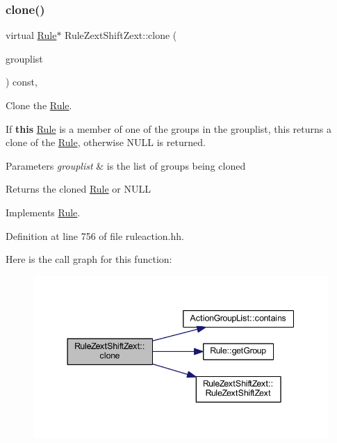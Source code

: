 \subsubsection{\texorpdfstring{clone()}{clone()}}
{\footnotesize\ttfamily virtual \mbox{\hyperlink{class_rule}{Rule}}$\ast$ Rule\+Zext\+Shift\+Zext\+::clone (\begin{DoxyParamCaption}\item[{const \mbox{\hyperlink{class_action_group_list}{Action\+Group\+List}} \&}]{grouplist }\end{DoxyParamCaption}) const\hspace{0.3cm}{\ttfamily [inline]}, {\ttfamily [virtual]}}



Clone the \mbox{\hyperlink{class_rule}{Rule}}. 

If {\bfseries{this}} \mbox{\hyperlink{class_rule}{Rule}} is a member of one of the groups in the grouplist, this returns a clone of the \mbox{\hyperlink{class_rule}{Rule}}, otherwise N\+U\+LL is returned. 
\begin{DoxyParams}{Parameters}
{\em grouplist} & is the list of groups being cloned \\
\hline
\end{DoxyParams}
\begin{DoxyReturn}{Returns}
the cloned \mbox{\hyperlink{class_rule}{Rule}} or N\+U\+LL 
\end{DoxyReturn}


Implements \mbox{\hyperlink{class_rule_a70de90a76461bfa7ea0b575ce3c11e4d}{Rule}}.



Definition at line 756 of file ruleaction.\+hh.

Here is the call graph for this function\+:
\nopagebreak
\begin{figure}[H]
\begin{center}
\leavevmode
\includegraphics[width=344pt]{class_rule_zext_shift_zext_ab25e32db23f550a5e97561ce7e6c4ca0_cgraph}
\end{center}
\end{figure}
\mbox{\label{class_rule_zext_shift_zext_aa145662e100fa5a94f300856b4e09a99}} 
